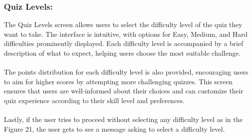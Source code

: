\subsubsection{Quiz Levels: }

The Quiz Levels screen allows users to select the difficulty level of the quiz they want to take. The interface is intuitive, with options for Easy, Medium, and Hard difficulties prominently displayed. Each difficulty level is accompanied by a brief description of what to expect, helping users choose the most suitable challenge. \\\\
The points distribution for each difficulty level is also provided, encouraging users to aim for higher scores by attempting more challenging quizzes. This screen ensures that users are well-informed about their choices and can customize their quiz experience according to their skill level and preferences. \\\\
Lastly, if the user tries to proceed without selecting any difficulty level as in the Figure 21, the user gets to see a message asking to select a difficulty level.

